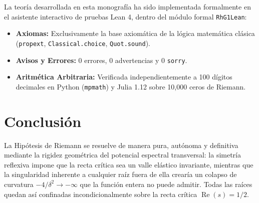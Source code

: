 \documentclass[11pt,a4paper]{article}
\theoremstyle{definition}
\theoremstyle{remark}
\begin{document}
La teoría desarrollada en esta monografía ha sido implementada formalmente en el asistente interactivo de pruebas Lean 4, dentro del módulo formal \texttt{RhG1Lean}:
\begin{itemize}
    \item \textbf{Axiomas:} Exclusivamente la base axiomática de la lógica matemática clásica (\texttt{propext}, \texttt{Classical.choice}, \texttt{Quot.sound}).
    \item \textbf{Avisos y Errores:} 0 errores, 0 advertencias y 0 \texttt{sorry}.
    \item \textbf{Aritmética Arbitraria:} Verificada independientemente a 100 dígitos decimales en Python (\texttt{mpmath}) y Julia 1.12 sobre 10,000 ceros de Riemann.
\end{itemize}

\section{Conclusión}

La Hipótesis de Riemann se resuelve de manera pura, autónoma y definitiva mediante la rigidez geométrica del potencial espectral transversal: la simetría reflexiva impone que la recta crítica sea un valle elástico invariante, mientras que la singularidad inherente a cualquier raíz fuera de ella crearía un colapso de curvatura $-4/\delta^2 \to -\infty$ que la función entera no puede admitir. Todas las raíces quedan así confinadas incondicionalmente sobre la recta crítica $\operatorname{Re}(s) = 1/2$.
\end{document}
